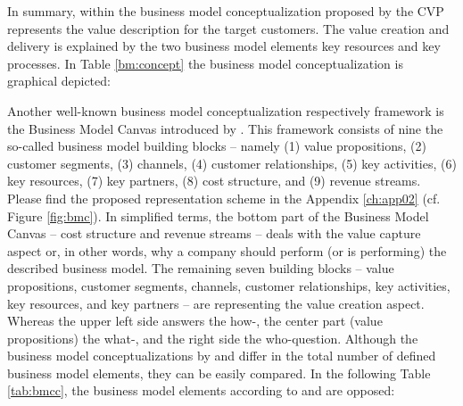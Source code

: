 In summary, within the business model conceptualization proposed by \citet[p. 54]{Johnson2008} the \ac{CVP} represents the value description for the target customers. The value creation and delivery is explained by the two business model elements key resources and key processes. In Table \ref{bm:concept} the business model conceptualization is graphical depicted:



Another well-known business model conceptualization respectively framework is the Business Model Canvas introduced by \citet{Osterwalder2010}. This framework consists of nine the so-called business model building blocks -- namely (1) value propositions, (2) customer segments, (3) channels, (4) customer relationships, (5) key activities, (6) key resources, (7) key partners, (8) cost structure, and (9) revenue streams. Please find the proposed representation scheme in the Appendix \ref{ch:app02} (cf. Figure \ref{fig:bmc}). In simplified terms, the bottom part of the Business Model Canvas -- cost structure and revenue streams -- deals with the value capture aspect or, in other words, why a company should perform (or is performing) the described business model. The remaining seven building blocks -- value propositions, customer segments, channels, customer relationships, key activities, key resources, and key partners -- are representing the value creation aspect. Whereas the upper left side answers the how-, the center part (value propositions) the what-, and the right side the who-question. Although the business model conceptualizations by \citet{Johnson2008} and \citet{Osterwalder2010} differ in the total number of defined business model elements, they can be easily compared. In the following Table \ref{tab:bmcc}, the business model elements according to \citet{Johnson2008} and \citet{Osterwalder2010} are opposed:

